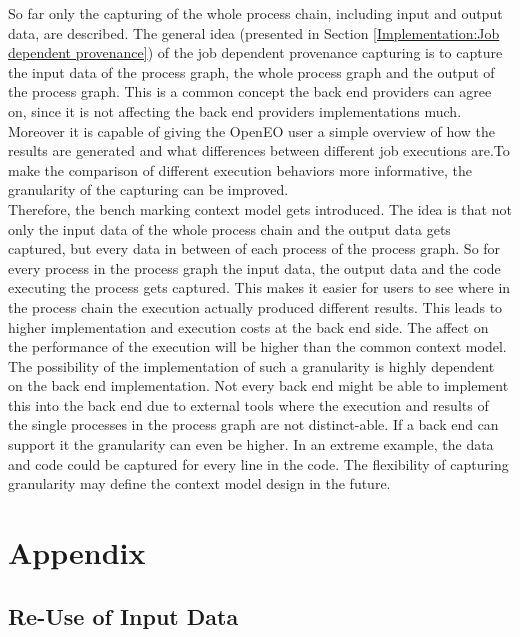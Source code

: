 \documentclass[draft,final]{vutinfth} %
\begin{document}
So far only the capturing of the whole process chain, including input and output data, are described. The general idea (presented in Section \ref{Implementation:Job dependent provenance}) of the job dependent provenance capturing is to capture the input data of the process graph, the whole process graph and the output of the process graph. This is a common concept the back end providers can agree on, since it is not affecting the back end providers implementations much. Moreover it is capable of giving the OpenEO user a simple overview of how the results are generated and what differences between different job executions are.To make the comparison of different execution behaviors more informative, the granularity of the capturing can be improved. \\
Therefore, the bench marking context model gets introduced. The idea is that not only the input data of the whole process chain and the output data gets captured, but every data in between of each process of the process graph. So for every process in the process graph the input data, the output data and the code executing the process gets captured. This makes it easier for users to see where in the process chain the execution actually produced different results. This leads to higher implementation and execution costs at the back end side. The affect on the performance of the execution will be higher than the common context model. The possibility of the implementation of such a granularity is highly dependent on the back end implementation. Not every back end might be able to implement this into the back end due to external tools where the execution and results of the single  processes in the process graph are not distinct-able. If a back end can support it the granularity can even be higher. In an extreme example, the data and code could be captured for every line in the code. The flexibility of capturing granularity may define the context model design in the future.  

\chapter{Appendix}\label{Appendix}

\section{Re-Use of Input Data}\label{usecase1appendix}
\end{document}
